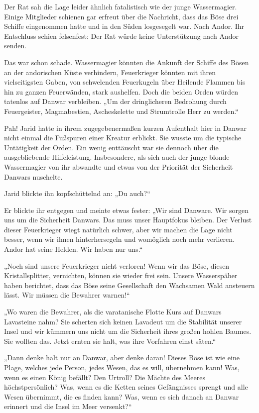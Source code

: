 Der Rat sah die Lage leider ähnlich fatalistisch wie der junge Wassermagier. Einige Mitglieder schienen gar erfreut über die Nachricht, dass das Böse drei Schiffe eingenommen hatte und in den Süden losgesegelt war. Nach Andor. Ihr Entschluss schien felsenfest: Der Rat würde keine Unterstützung nach Andor senden.

Das war schon schade. Wassermagier könnten die Ankunft der Schiffe des Bösen an der andorischen Küste verhindern, Feuerkrieger könnten mit ihren vielseitigsten Gaben, von schwelenden Feuerkugeln über Heilende Flammen bis hin zu ganzen Feuerwänden, stark aushelfen. Doch die beiden Orden würden tatenlos auf Danwar verbleiben. „Um der dringlicheren Bedrohung durch Feuergeister, Magmabestien, Ascheskelette und Strumtrolle Herr zu werden.“

Pah! Jarid hatte in ihrem zugegebenermaßen kurzen Aufenthalt hier in Danwar nicht einmal die Fußspuren einer Kreatur erblickt. Sie wusste um die typische Untätigkeit der Orden. Ein wenig enttäuscht war sie dennoch über die ausgebliebende Hilfeleistung. Insbesondere, als sich auch der junge blonde Wassermagier von ihr abwandte und etwas von der Priorität der Sicherheit Danwars nuschelte.

Jarid blickte ihn kopfschüttelnd an: „Du auch?“

Er blickte ihr entgegen und meinte etwas fester: „Wir sind Danware. Wir sorgen uns um die Sicherheit Danwars. Das muss unser Hauptfokus bleiben. Der Verlust dieser Feuerkrieger wiegt natürlich schwer, aber wir machen die Lage nicht besser, wenn wir ihnen hinterhersegeln und womöglich noch mehr verlieren. Andor hat seine Helden. Wir haben nur uns.“

„Noch sind unsere Feuerkrieger nicht verloren! Wenn wir das Böse, diesen Kristallsplitter, vernichten, können sie wieder frei sein. Unsere Wasserspäher haben berichtet, dass das Böse seine Gesellschaft den Wachsamen Wald ansteuern lässt. Wir müssen die Bewahrer warnen!“

„Wo waren die Bewahrer, als die varatanische Flotte Kurs auf Danwars Lavasteine nahm? Sie scherten sich keinen Lavadeut um die Stabilität unserer Insel und wir kümmern uns nicht um die Sicherheit ihres großen hohlen Baumes. Sie wollten das. Jetzt ernten sie halt, was ihre Vorfahren einst säten.“

„Dann denke halt nur an Danwar, aber denke daran! Dieses Böse ist wie eine Plage, welches jede Person, jedes Wesen, das es will, übernehmen kann! Was, wenn es einen König befällt? Den Urtroll? Die Mächte des Meeres höchstpersönlich? Was, wenn es die Ketten seines Gefängnisses sprengt und alle Wesen übernimmt, die es finden kann? Was, wenn es sich danach an Danwar erinnert und die Insel im Meer versenkt?“

